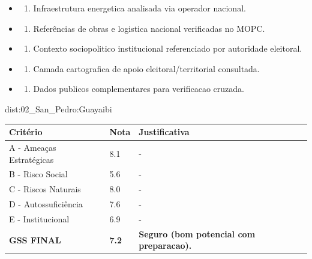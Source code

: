 {\begin{itemize}
\item
  \begin{enumerate}
  \def\labelenumi{\arabic{enumi})}
  \setcounter{enumi}{7}
  \tightlist
  \item
    Infraestrutura energetica analisada via operador nacional.
  \end{enumerate}
\item
  \begin{enumerate}
  \def\labelenumi{\arabic{enumi})}
  \setcounter{enumi}{8}
  \tightlist
  \item
    Referências de obras e logistica nacional verificadas no MOPC.
  \end{enumerate}
\item
  \begin{enumerate}
  \def\labelenumi{\arabic{enumi})}
  \setcounter{enumi}{9}
  \tightlist
  \item
    Contexto sociopolitico institucional referenciado por autoridade
    eleitoral.
  \end{enumerate}
\item
  \begin{enumerate}
  \def\labelenumi{\arabic{enumi})}
  \setcounter{enumi}{10}
  \tightlist
  \item
    Camada cartografica de apoio eleitoral/\allowbreak territorial consultada.
  \end{enumerate}
\item
  \begin{enumerate}
  \def\labelenumi{\arabic{enumi})}
  \setcounter{enumi}{11}
  \tightlist
  \item
    Dados publicos complementares para verificacao cruzada.
  \end{enumerate}
\end{itemize}}{dist:02_San_Pedro:Guayaibi}
\begin{table}[ht!]
\small \begin{tabular}{p{3.0cm}p{0.8cm}p{6.0cm}} \toprule
\textbf{Critério} & \textbf{Nota} & \textbf{Justificativa} \\ \midrule
A - Ameaças Estratégicas & 8.1 & - \\
B - Risco Social & 5.6 & - \\
C - Riscos Naturais & 8.0 & - \\
D - Autossuficiência & 7.6 & - \\
E - Institucional & 6.9 & - \\
\midrule \textbf{GSS FINAL} & \textbf{7.2} & \textbf{Seguro (bom potencial com preparacao).} \\ \bottomrule \end{tabular}
\end{table}
